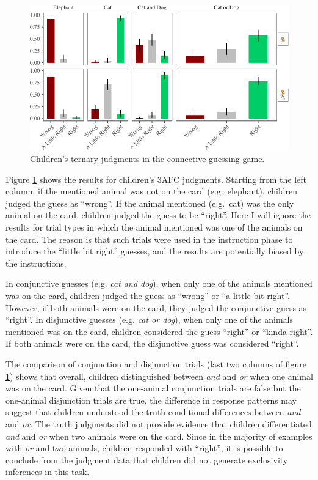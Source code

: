 \documentclass[man]{apa6}
\theoremstyle{definition}
\theoremstyle{definition}
\theoremstyle{definition}
\theoremstyle{remark}
\begin{document}
\begin{figure}[t]

{\centering \includegraphics{figs/childrenTernaryPlot-1} 

}

\caption{Children's ternary judgments in the connective guessing game.}\label{fig:childrenTernaryPlot}
\end{figure}

Figure \ref{fig:childrenTernaryPlot} shows the results for children's
3AFC judgments. Starting from the left column, if the mentioned animal
was not on the card (e.g.~elephant), children judged the guess as
\enquote{wrong}. If the animal mentioned (e.g.~cat) was the only animal
on the card, children judged the guess to be \enquote{right}. Here I
will ignore the results for trial types in which the animal mentioned
was one of the animals on the card. The reason is that such trials were
used in the instruction phase to introduce the \enquote{little bit
right} guesses, and the results are potentially biased by the
instructions.

In conjunctive guesses (e.g. \emph{cat and dog}), when only one of the
animals mentioned was on the card, children judged the guess as
\enquote{wrong} or \enquote{a little bit right}. However, if both
animals were on the card, they judged the conjunctive guess as
\enquote{right}. In disjunctive guesses (e.g. \emph{cat or dog}), when
only one of the animals mentioned was on the card, children considered
the guess \enquote{right} or \enquote{kinda right}. If both animals were
on the card, the disjunctive guess was considered \enquote{right}.

The comparison of conjunction and disjunction trials (last two columns
of figure \ref{fig:childrenTernaryPlot}) shows that overall, children
distinguished between \emph{and} and \emph{or} when one animal was on
the card. Given that the one-animal conjunction trials are false but the
one-animal disjunction trials are true, the difference in response
patterns may suggest that children understood the truth-conditional
differences between \emph{and} and \emph{or}. The truth judgments did
not provide evidence that children differentiated \emph{and} and
\emph{or} when two animals were on the card. Since in the majority of
examples with \emph{or} and two animals, children responded with
\enquote{right}, it is possible to conclude from the judgment data that
children did not generate exclusivity inferences in this task.
\end{document}
